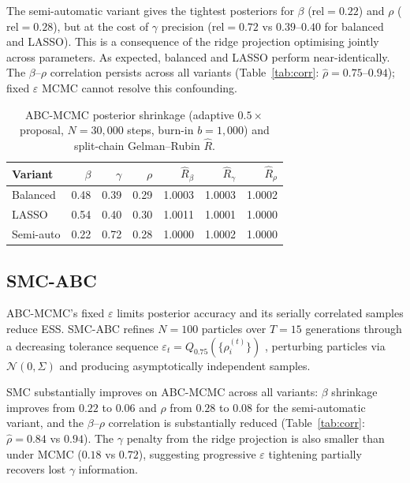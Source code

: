 \documentclass[11pt, a4paper]{article}
\begin{document}
The semi-automatic variant gives the tightest posteriors for $\beta$ ($\text{rel} = 0.22$) and
$\rho$ ($\text{rel} = 0.28$), but at the cost of $\gamma$ precision ($\text{rel} = 0.72$ vs
$0.39$--$0.40$ for balanced and LASSO). This is a consequence of the ridge projection optimising
jointly across parameters. As expected, balanced and LASSO perform near-identically. The $\beta$--$\rho$ correlation persists across all variants
(Table~\ref{tab:corr}: $\hat\rho=0.75$--$0.94$); fixed $\varepsilon$ MCMC cannot resolve
this confounding.

\begin{table}[h]
\centering
\caption{ABC-MCMC posterior shrinkage (adaptive $0.5\times$ proposal, $N = 30{,}000$ steps,
         burn-in $b = 1{,}000$) and split-chain Gelman--Rubin $\hat{R}$.}
\label{tab:mcmc}
\begin{tabular}{lrrrrrr}
\toprule
Variant & $\beta$ & $\gamma$ & $\rho$ & $\hat{R}_\beta$ & $\hat{R}_\gamma$ & $\hat{R}_\rho$ \\
\midrule
Balanced   & 0.48 & 0.39 & 0.29 & 1.0003 & 1.0003 & 1.0002 \\
LASSO      & 0.54 & 0.40 & 0.30 & 1.0011 & 1.0001 & 1.0000 \\
Semi-auto  & 0.22 & 0.72 & 0.28 & 1.0000 & 1.0002 & 1.0000 \\
\bottomrule
\end{tabular}
\end{table}

\subsection{SMC-ABC \citep{sisson2007}}
\label{sec:smcabc}

ABC-MCMC's fixed $\varepsilon$ limits posterior accuracy and its serially correlated samples
reduce ESS. SMC-ABC refines $N = 100$ particles over $T = 15$ generations through a
decreasing tolerance sequence $\varepsilon_t = Q_{0.75}(\{\rho_i^{(t)}\})$ \citep{beaumont2009},
perturbing particles via $\mathcal{N}(0, \Sigma)$ and producing asymptotically independent samples.

SMC substantially improves on ABC-MCMC across all variants: $\beta$ shrinkage
improves from $0.22$ to $0.06$ and $\rho$ from $0.28$ to $0.08$ for the semi-automatic
variant, and the $\beta$--$\rho$ correlation is substantially reduced
(Table~\ref{tab:corr}: $\hat\rho=0.84$ vs $0.94$).
The $\gamma$ penalty from the ridge projection is also smaller than under MCMC
($0.18$ vs $0.72$), suggesting progressive $\varepsilon$ tightening partially recovers
lost $\gamma$ information.
\end{document}
